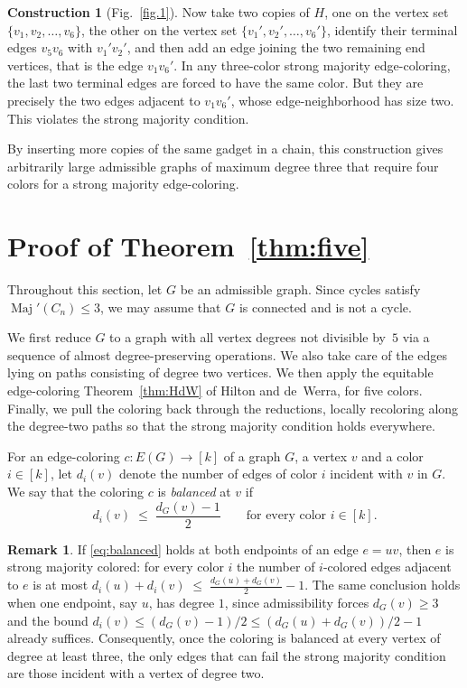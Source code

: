 \documentclass[11pt]{article}
\theoremstyle{definition}
\newtheorem{remark}[theorem]{Remark}
\newtheorem{construction}{Construction}
\DeclareMathOperator{\Maj}{Maj}
\newcommand{\Majp}{\Maj'}
\begin{document}
\begin{construction}[Fig.~\ref{fig.1}]
Now take two copies of \(H\), one on the vertex set $\{v_1,v_2,\dots,v_6\}$, the other on the vertex set $\{v_1',v_2',\dots,v_6'\}$, identify their terminal edges $v_5v_6$ with $v_1'v_2'$, and then add an edge joining the two remaining end vertices, that is the edge $v_1v_6'$. In any three-color strong majority edge-coloring, the last two terminal edges are forced to have the same color. But they are precisely the two edges adjacent to  $v_1v_6'$, whose edge-neighborhood has size two. This violates the strong majority condition.

By inserting more copies of the same gadget in a chain, this construction gives arbitrarily large admissible graphs of maximum degree three that require four colors for a strong majority edge-coloring.

\end{construction}

\section{Proof of Theorem~\ref{thm:five}}\label{sec:five}

Throughout this section, let $G$ be an admissible graph. 
Since cycles satisfy $\Majp(C_n)\le 3$, we may assume that $G$ is connected and is not a cycle. 

We first reduce $G$ to a graph with all vertex degrees not divisible by~$5$ via a sequence of almost degree-preserving operations. We also take care of the edges lying on paths consisting of degree two vertices.
We then apply the equitable edge-coloring Theorem~\ref{thm:HdW} of Hilton and de~Werra, for five colors. Finally, we pull the coloring back through the reductions, locally recoloring along the degree-two paths so that the strong majority condition holds everywhere.

For an edge-coloring $c:E(G)\to[k]$ of a graph $G$, a vertex $v$ and a color $i\in[k]$, let $d_i(v)$ denote the number of edges of color $i$ incident with $v$ in $G$. We say that the coloring $c$ is \emph{balanced} at $v$ if
\begin{equation}\label{eq:balanced}
        d_i(v)\;\le\;\frac{d_G(v)-1}{2}
        \qquad\text{for every color }i \in [k].
\end{equation}

\begin{remark}\label{rem:balanced-suffices}
If \eqref{eq:balanced} holds at both endpoints of an edge $e=uv$, then $e$ is strong majority colored: for every color $i$ the number of $i$-colored edges adjacent to $e$ is at most $d_i(u)+d_i(v)\;\le\;\frac{d_G(u)+d_G(v)}{2}-1.$
The same conclusion holds when one endpoint, say $u$, has degree $1$, since admissibility forces $d_G(v)\ge 3$ and the bound $d_i(v)\le \left(d_G(v)-1\right)/2\le \left(d_G(u)+d_G(v)\right)/2-1$ already suffices. Consequently, once the coloring is balanced at every vertex of degree at least three, the only edges that can fail the strong majority condition are those incident with a vertex of degree two.
\end{remark}
\end{document}
